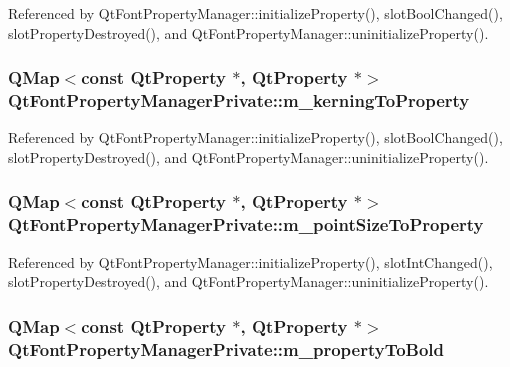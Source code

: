 Referenced by Qt\+Font\+Property\+Manager\+::initialize\+Property(), slot\+Bool\+Changed(), slot\+Property\+Destroyed(), and Qt\+Font\+Property\+Manager\+::uninitialize\+Property().

\subsubsection[{m\+\_\+kerning\+To\+Property}]{\setlength{\rightskip}{0pt plus 5cm}Q\+Map$<$const {\bf Qt\+Property} $\ast$, {\bf Qt\+Property} $\ast$$>$ Qt\+Font\+Property\+Manager\+Private\+::m\+\_\+kerning\+To\+Property}\label{classQtFontPropertyManagerPrivate_a7c26140870a7b1d3898d9999f400c784}


Referenced by Qt\+Font\+Property\+Manager\+::initialize\+Property(), slot\+Bool\+Changed(), slot\+Property\+Destroyed(), and Qt\+Font\+Property\+Manager\+::uninitialize\+Property().

\subsubsection[{m\+\_\+point\+Size\+To\+Property}]{\setlength{\rightskip}{0pt plus 5cm}Q\+Map$<$const {\bf Qt\+Property} $\ast$, {\bf Qt\+Property} $\ast$$>$ Qt\+Font\+Property\+Manager\+Private\+::m\+\_\+point\+Size\+To\+Property}\label{classQtFontPropertyManagerPrivate_a1faefce30e0dff794cefc69c27162169}


Referenced by Qt\+Font\+Property\+Manager\+::initialize\+Property(), slot\+Int\+Changed(), slot\+Property\+Destroyed(), and Qt\+Font\+Property\+Manager\+::uninitialize\+Property().

\subsubsection[{m\+\_\+property\+To\+Bold}]{\setlength{\rightskip}{0pt plus 5cm}Q\+Map$<$const {\bf Qt\+Property} $\ast$, {\bf Qt\+Property} $\ast$$>$ Qt\+Font\+Property\+Manager\+Private\+::m\+\_\+property\+To\+Bold}\label{classQtFontPropertyManagerPrivate_affdc98fa99efeef21018317f634c8f05}


